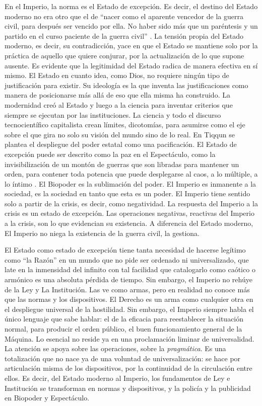 En el Imperio, la norma es el Estado de excepción. Es decir, el destino del Estado moderno no era otro que el de \enquote{nacer como el aparente vencedor de la guerra civil, para después ser vencido por ella. No haber sido más que un paréntesis y un partido en el curso paciente de la guerra civil} \autocite{tiqqunIntroduccionGuerraCivil2008}. La tensión propia del Estado moderno, es decir, su contradicción, yace en que el Estado se mantiene solo por la práctica de aquello que quiere conjurar, por la actualización de lo que supone ausente. Es evidente que la legitimidad del Estado radica de manera efectiva en sí mismo. El Estado en cuanto idea, como Dios, no requiere ningún tipo de justificación para existir. Su ideología es la que inventa las justificaciones como manera de posicionarse más allá de eso que ella misma ha construido. La modernidad creó al Estado y luego a la ciencia para inventar criterios que siempre se ejecutan por las instituciones. La ciencia y todo el discurso tecnocientífico capitalista crean límites, dicotomías, para asumirse como el eje sobre el que gira no solo su visión del mundo sino de lo real. En Tiqqun se plantea el despliegue del poder estatal como una pacificación. El Estado de excepción puede ser descrito como la paz en el Espectáculo, como la invisibilización de un montón de guerras que son libradas para mantener un orden, para contener toda potencia que puede desplegarse al caos, a lo múltiple, a lo íntimo \autocite[pp.~59-97]{tiqqunIntroduccionGuerraCivil2008}. El Biopoder es la sublimación del poder. El Imperio es inmanente a la sociedad, es la sociedad en tanto que esta es un poder. El Imperio tiene sentido solo a partir de la crisis, es decir, como negatividad. La respuesta del Imperio a la crisis es un estado de excepción. Las operaciones negativas, reactivas del Imperio a la crisis, son lo que evidencian su existencia. A diferencia del Estado moderno, El Imperio no niega la existencia de la guerra civil, la gestiona.

El Estado como estado de excepción tiene tanta necesidad de hacerse legítimo como \enquote{la Razón} en un mundo que no pide ser ordenado ni universalizado, que late en la inmensidad del infinito con tal facilidad que catalogarlo como caótico o armónico es una absoluta pérdida de tiempo. Sin embargo, el Imperio no rehúye de la Ley y La Institución. Las ve como armas, pero en realidad no conoce más que las normas y los dispositivos. El Derecho es un arma como cualquier otra en el despliegue universal de la hostilidad. Sin embargo, el Imperio siempre habla el único lenguaje que sabe hablar: el de la eficacia para reestablecer la situación normal, para producir el orden público, el buen funcionamiento general de la Máquina. Lo esencial no reside ya en una proclamación liminar de universalidad. La atención se apoya sobre las operaciones, sobre la \emph{pragmática}. Es una totalización que no nace ya de una voluntad de universalización: se hace por articulación misma de los dispositivos, por la continuidad de la circulación entre ellos. Es decir, del Estado moderno al Imperio, los fundamentos de Ley e Institución se transforman en normas y dispositivos, y la policía y la publicidad en Biopoder y Espectáculo.

